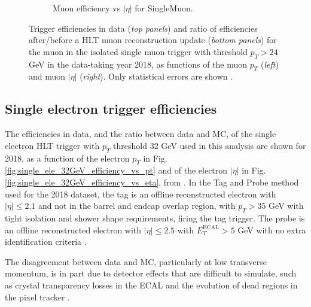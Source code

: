 \begin{figure}[h]
\begin{subfigure}{0.45\textwidth}
        \caption{Muon efficiency vs $|\eta|$ for SingleMuon.}
        \label{fig:single_muon_24GeV_efficiency_vs_eta}
    \end{subfigure}
    \caption[Trigger efficiencies in data (\textit{top panels}) and ratio of efficiencies after/before a HLT muon reconstruction update (\textit{bottom panels}) for the muon in the isolated single muon trigger with threshold $p_{T} > 24$ GeV in the data-taking year 2018, as functions of the muon $p_{T}$ (\textit{left}) and muon $|\eta|$ (\textit{right}).]{Trigger efficiencies in data (\textit{top panels}) and ratio of efficiencies after/before a HLT muon reconstruction update (\textit{bottom panels}) for the muon in the isolated single muon trigger with threshold $p_{T} > 24$ GeV in the data-taking year 2018, as functions of the muon $p_{T}$ (\textit{left}) and muon $|\eta|$ (\textit{right}). Only statistical errors are shown \cite{CMS-DP-2018-034}.} 
\end{figure}

\subsection{Single electron trigger efficiencies}

The efficiencies in data, and the ratio between data and MC, of the single electron HLT trigger with $p_{T}$ threshold 32 GeV used in this analysis are shown for 2018, as a function of the electron $p_{T}$ in Fig. \ref{fig:single_ele_32GeV_efficiency_vs_pt} and of the electron $|\eta|$ in Fig. \ref{fig:single_ele_32GeV_efficiency_vs_eta}, from \cite{CMS-DP-2020-016}. In the Tag and Probe method used for the 2018 dataset, the tag is an offline reconstructed electron with $|\eta| \leq 2.1$ and not in the barrel and endcap overlap region, with $p_{T} > 35$ GeV with tight isolation and shower shape requirements, firing the tag trigger. The probe is an offline reconstructed electron with $|\eta| \leq 2.5$ with $E_T^\text{ECAL} > 5$ GeV with no extra identification criteria \cite{CMS-DP-2020-016}. 

The disagreement between data and MC, particularly at low transverse momentum, is in part due to detector effects that are difficult to simulate, such as crystal transparency losses in the ECAL and the evolution of dead regions in the pixel tracker \cite{CMS-DP-2020-016}.

